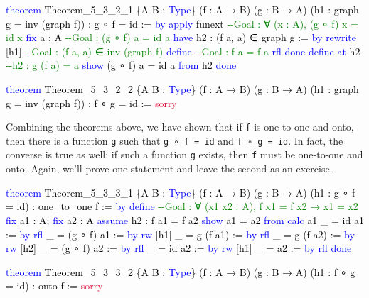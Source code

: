 \documentclass[
  letterpaper,
  DIV=11,
  numbers=noendperiod]{scrreprt}
\newenvironment{Shaded}{\begin{snugshade}}{\end{snugshade}}
\newcommand{\CommentTok}[1]{\textcolor[rgb]{0.37,0.37,0.37}{#1}}
\newcommand{\ConstantTok}[1]{\textcolor[rgb]{0.56,0.35,0.01}{#1}}
\newcommand{\KeywordTok}[1]{\textcolor[rgb]{0.00,0.23,0.31}{#1}}
\newcommand{\NormalTok}[1]{\textcolor[rgb]{0.00,0.23,0.31}{#1}}
\renewcommand{\NormalTok}[1]{\textcolor[HTML]{000000}{#1}}
\renewcommand{\KeywordTok}[1]{\textcolor[HTML]{0000FF}{#1}}
\renewcommand{\CommentTok}[1]{\textcolor[HTML]{008000}{#1}}
\renewcommand{\ConstantTok}[1]{\textcolor[HTML]{DC143C}{#1}}
\theoremstyle{remark}
\begin{document}
\begin{Shaded}
\begin{Highlighting}[]
\KeywordTok{theorem}\NormalTok{ Theorem\_5\_3\_2\_1 \{A B : }\KeywordTok{Type}\NormalTok{\} (f : A → B) (g : B → A)}
\NormalTok{    (h1 : graph g = inv (graph f)) : g ∘ f = id := }\KeywordTok{by}
  \KeywordTok{apply}\NormalTok{ funext           }\CommentTok{{-}{-}Goal : ∀ (x : A), (g ∘ f) x = id x}
  \KeywordTok{fix}\NormalTok{ a : A              }\CommentTok{{-}{-}Goal : (g ∘ f) a = id a}
  \KeywordTok{have}\NormalTok{ h2 : (f a, a) ∈ graph g := }\KeywordTok{by}
    \KeywordTok{rewrite}\NormalTok{ [h1]         }\CommentTok{{-}{-}Goal : (f a, a) ∈ inv (graph f)}
    \KeywordTok{define}               \CommentTok{{-}{-}Goal : f a = f a}
    \KeywordTok{rfl}
    \KeywordTok{done}
  \KeywordTok{define} \KeywordTok{at}\NormalTok{ h2           }\CommentTok{{-}{-}h2 : g (f a) = a}
  \KeywordTok{show}\NormalTok{ (g ∘ f) a = id a }\KeywordTok{from}\NormalTok{ h2}
  \KeywordTok{done}

\KeywordTok{theorem}\NormalTok{ Theorem\_5\_3\_2\_2 \{A B : }\KeywordTok{Type}\NormalTok{\} (f : A → B) (g : B → A)}
\NormalTok{    (h1 : graph g = inv (graph f)) : f ∘ g = id := }\ConstantTok{sorry}
\end{Highlighting}
\end{Shaded}

Combining the theorems above, we have shown that if \texttt{f} is
one-to-one and onto, then there is a function \texttt{g} such that
\texttt{g\ ∘\ f\ =\ id} and \texttt{f\ ∘\ g\ =\ id}. In fact, the
converse is true as well: if such a function \texttt{g} exists, then
\texttt{f} must be one-to-one and onto. Again, we'll prove one statement
and leave the second as an exercise.

\begin{Shaded}
\begin{Highlighting}[]
\KeywordTok{theorem}\NormalTok{ Theorem\_5\_3\_3\_1 \{A B : }\KeywordTok{Type}\NormalTok{\} (f : A → B) (g : B → A)}
\NormalTok{    (h1 : g ∘ f = id) : one\_to\_one f := }\KeywordTok{by}
  \KeywordTok{define}              \CommentTok{{-}{-}Goal : ∀ (x1 x2 : A), f x1 = f x2 → x1 = x2}
  \KeywordTok{fix}\NormalTok{ a1 : A; }\KeywordTok{fix}\NormalTok{ a2 : A}
  \KeywordTok{assume}\NormalTok{ h2 : f a1 = f a2}
  \KeywordTok{show}\NormalTok{ a1 = a2 }\KeywordTok{from}
    \KeywordTok{calc}\NormalTok{ a1}
\NormalTok{      \_ = id a1 := }\KeywordTok{by} \KeywordTok{rfl}
\NormalTok{      \_ = (g ∘ f) a1 := }\KeywordTok{by} \KeywordTok{rw}\NormalTok{ [h1]}
\NormalTok{      \_ = g (f a1) := }\KeywordTok{by} \KeywordTok{rfl}
\NormalTok{      \_ = g (f a2) := }\KeywordTok{by} \KeywordTok{rw}\NormalTok{ [h2]}
\NormalTok{      \_ = (g ∘ f) a2 := }\KeywordTok{by} \KeywordTok{rfl}
\NormalTok{      \_ = id a2 := }\KeywordTok{by} \KeywordTok{rw}\NormalTok{ [h1]}
\NormalTok{      \_ = a2 := }\KeywordTok{by} \KeywordTok{rfl}
  \KeywordTok{done}

\KeywordTok{theorem}\NormalTok{ Theorem\_5\_3\_3\_2 \{A B : }\KeywordTok{Type}\NormalTok{\} (f : A → B) (g : B → A)}
\NormalTok{    (h1 : f ∘ g = id) : onto f := }\ConstantTok{sorry}
\end{Highlighting}
\end{Shaded}
\end{document}
